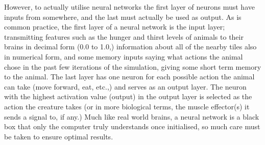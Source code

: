 \documentclass[]{report}
\begin{document}
However, to actually utilise neural networks the first layer of neurons must have inputs from somewhere, and the last must actually be used as output. As is common practice, the first layer of a neural network is the input layer; transmitting features such as the hunger and thirst levels of animals to their brains in decimal form (0.0 to 1.0,) information about all of the nearby tiles also in numerical form, and some memory inputs saying what actions the animal chose in the past few iterations of the simulation, giving some short term memory to the animal. The last layer has one neuron for each possible action the animal can take (move forward, eat, etc.,) and serves as an output layer. The neuron with the highest activation value (output) in the output layer is selected as the action the creature takes (or in more biological terms, the muscle effector(s) it sends a signal to, if any.) Much like real world brains, a neural network is a black box that only the computer truly understands once initialised, so much care must be taken to ensure optimal results.
\end{document}
